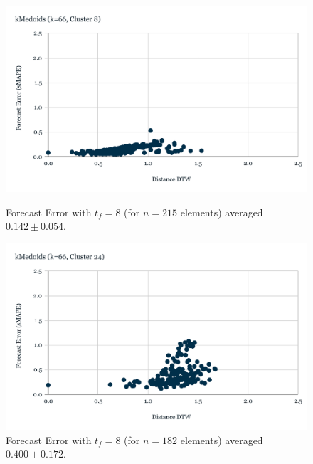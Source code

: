\begin{figure}[!htbp]
  \centering
  \begin{minipage}[b]{0.45\textwidth}
    \includegraphics[width=\textwidth]{../Figures/distDTW_ForecastError_k66_c8}
    \caption{Forecast Error with $t_{f}=8$ (for $n=215$ elements) averaged $0.142 \pm 0.054$.}
    \label{Fig:DTWsMAPE_k66_c8}
  \end{minipage}
  \hfill
  \begin{minipage}[b]{0.45\textwidth}
    \includegraphics[width=\textwidth]{../Figures/distDTW_ForecastError_k66_c24}
    \caption{Forecast Error with $t_{f}=8$ (for $n=182$ elements) averaged $0.400 \pm 0.172$.}
    \label{Fig:DTWsMAPE_k66_c24}
  \end{minipage}


\end{figure}
